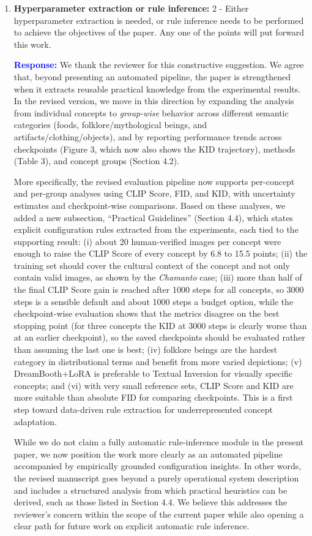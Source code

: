 \documentclass[11pt]{article}
\begin{document}
\begin{enumerate}[label=\textbf{C\arabic*.}, leftmargin=*]
\item \textbf{Hyperparameter extraction or rule inference:} 2 - Either hyperparameter extraction is needed, or rule inference needs to be performed to achieve the objectives of the paper. Any one of the points will put forward this work.

\textbf{\textcolor{blue}{Response:}} We thank the reviewer for this constructive suggestion. We agree that, beyond presenting an automated pipeline, the paper is strengthened when it extracts reusable practical knowledge from the experimental results. In the revised version, we move in this direction by expanding the analysis from individual concepts to \emph{group-wise} behavior across different semantic categories (foods, folklore/mythological beings, and artifacts/clothing/objects), and by reporting performance trends across checkpoints (Figure 3, which now also shows the KID trajectory), methods (Table 3), and concept groups (Section 4.2).

More specifically, the revised evaluation pipeline now supports per-concept and per-group analyses using CLIP Score, FID, and KID, with uncertainty estimates and checkpoint-wise comparisons. Based on these analyses, we added a new subsection, ``Practical Guidelines'' (Section 4.4), which states explicit configuration rules extracted from the experiments, each tied to the supporting result: (i) about 20 human-verified images per concept were enough to raise the CLIP Score of every concept by 6.8 to 15.5 points; (ii) the training set should cover the cultural context of the concept and not only contain valid images, as shown by the \textit{Chamanto} case; (iii) more than half of the final CLIP Score gain is reached after 1000 steps for all concepts, so 3000 steps is a sensible default and about 1000 steps a budget option, while the checkpoint-wise evaluation shows that the metrics disagree on the best stopping point (for three concepts the KID at 3000 steps is clearly worse than at an earlier checkpoint), so the saved checkpoints should be evaluated rather than assuming the last one is best; (iv) folklore beings are the hardest category in distributional terms and benefit from more varied depictions; (v) DreamBooth+LoRA is preferable to Textual Inversion for visually specific concepts; and (vi) with very small reference sets, CLIP Score and KID are more suitable than absolute FID for comparing checkpoints. This is a first step toward data-driven rule extraction for underrepresented concept adaptation.

While we do not claim a fully automatic rule-inference module in the present paper, we now position the work more clearly as an automated pipeline accompanied by empirically grounded configuration insights. In other words, the revised manuscript goes beyond a purely operational system description and includes a structured analysis from which practical heuristics can be derived, such as those listed in Section 4.4. We believe this addresses the reviewer’s concern within the scope of the current paper while also opening a clear path for future work on explicit automatic rule inference.
\end{enumerate}
\end{document}
